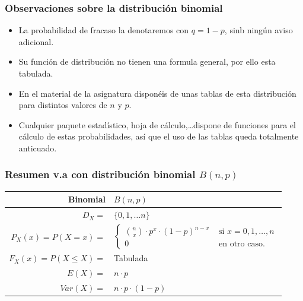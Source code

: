 \documentclass[handout]{beamer}\usepackage[]{graphicx}\usepackage[]{color}
\renewcommand{\emph}[1]{{\color{red}#1}}
\renewcommand{\leq}{\leqslant}
\theoremstyle{plain}
\theoremstyle{definition}
\begin{document}
\begin{frame}
\frametitle{Observaciones sobre la distribución binomial}
\begin{itemize}
\item La probabilidad de fracaso la denotaremos con  $q=1-p$, sinb ningún aviso adicional.
\item Su función de distribución no tienen una formula general, por ello esta tabulada.
\item En el material de la asignatura disponéis de unas tablas de esta distribución
para distintos valores de $n$ y $p$. 
\item Cualquier paquete estadístico, hoja de cálculo,\ldots dispone de
funciones para el cálculo de estas probabilidades, así que el uso de las tablas queda \emph{totalmente anticuado}. 
\end{itemize}
\end{frame}

\begin{frame}

\frametitle{Resumen v.a con distribución binomial $B(n,p)$}
\scriptsize
\begin{table}
\centering
\begin{tabular}{|rl|}
\hline 
\textbf{Binomial} & $B(n,p)$\\
\hline \hline 
$D_X=$&  $\{0,1,\ldots n\}$ \\\hline 
$P_X(x)=P(X=x)=$ & 
$\left\{
\begin{array}{ll}
{n\choose x}\cdot  p^x\cdot  (1-p)^{n-x} & \mbox{ si } x=0,1,\ldots,n\\
     0  & \mbox{ en otro caso.}
\end{array}
\right.$
\\ \hline 
$F_X(x)=P(X\leq X)=$ & Tabulada \\\hline 
$E(X)=$ &  $n\cdot p$\\
$Var(X)=$ & $n\cdot p \cdot (1-p)$\\
\hline
\end{tabular}
\end{table}
\normalsize
\end{frame}
\end{document}
